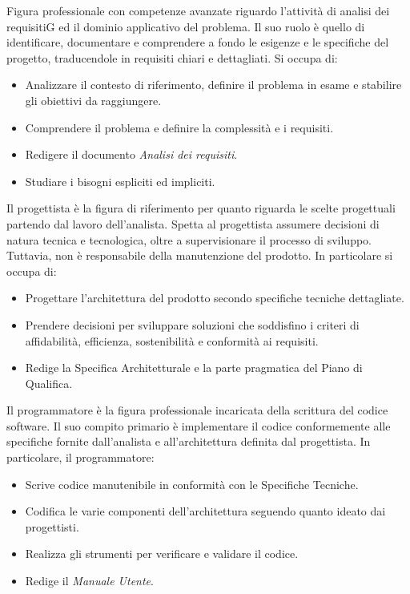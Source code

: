 Figura professionale con competenze avanzate riguardo l’attività di analisi dei requisitiG ed il dominio applicativo del problema. Il suo ruolo è quello di identificare, documentare e comprendere a fondo le esigenze e le specifiche del progetto, traducendole in requisiti chiari e dettagliati. Si occupa di:
\begin{itemize}
    \item Analizzare il contesto di riferimento, definire il problema in esame e stabilire gli obiettivi da raggiungere.
    \item Comprendere il  problema e definire la complessità e i requisiti.
    \item Redigere il documento \textit{Analisi dei requisiti}.
    \item Studiare i bisogni espliciti ed impliciti.
\end{itemize}
Il progettista è la figura di riferimento per quanto riguarda le scelte progettuali partendo dal lavoro dell’analista. Spetta al progettista assumere decisioni di natura tecnica e tecnologica, oltre a supervisionare il processo di sviluppo. Tuttavia, non è responsabile della manutenzione del prodotto.
In particolare si occupa di:
\begin{itemize}
    \item Progettare l’architettura del prodotto secondo specifiche tecniche dettagliate.
    \item Prendere decisioni per sviluppare soluzioni che soddisfino i criteri di affidabilità,
    efficienza, sostenibilità e conformità ai requisiti.
    \item Redige la Specifica Architetturale e la parte pragmatica del Piano di Qualifica.
\end{itemize}
Il programmatore è la figura professionale incaricata della scrittura del codice software. Il suo compito primario è implementare il codice conformemente alle specifiche fornite dall’analista e all’architettura definita dal progettista.
In particolare, il programmatore:
\begin{itemize}
    \item Scrive codice manutenibile in conformità con le Specifiche Tecniche.
    \item Codifica le varie componenti dell’architettura seguendo quanto ideato dai progettisti.
    \item Realizza gli strumenti per verificare e validare il codice.
    \item Redige il \textit{Manuale Utente}.
\end{itemize}
